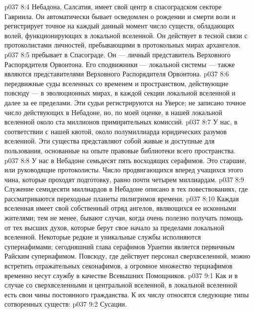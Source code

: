 \vs p037 8:4  Небадона, Салсатия, имеет свой центр в спасоградском секторе Гавриила. Он автоматически бывает осведомлен о рождении и смерти воли и регистрирует точное на каждый данный момент число существ, обладающих волей, функционирующих в локальной вселенной. Он действует в тесной связи с протоколистами личностей, пребывающими в протокольных мирах архангелов.
\vs p037 8:5  пребывает в Спасограде. Он --- личный представитель Верховного Распорядителя Орвонтона. Его сподвижники ---  локальной системы --- также являются представителями Верховного Распорядителя Орвонтона.
\vs p037 8:6  передвижные суды вселенных со временем и пространством, действующие повсюду --- в эволюционных мирах, в каждой секции локальной вселенной и далее за ее пределами. Эти судьи регистрируются на Уверсе; не записано точное число действующих в Небадоне, но, по моей оценке, в нашей локальной вселенной около ста миллионов примирительных комиссий.
\vs p037 8:7 У нас, в соответствии с нашей квотой, около полумиллиарда  юридических разумов вселенной. Эти существа представляют собой живые и доступные для пользования, основанные на опыте правовые библиотеки всего пространства.
\vs p037 8:8 У нас в Небадоне семьдесят пять  восходящих серафимов. Это старшие, или руководящие протоколисты. Число продвигающихся вперед учащихся этого чина, которые проходят подготовку, равно почти четырем миллиардам.
\vs p037 8:9 Служение семидесяти миллиардов  в Небадоне описано в тех повествованиях, где рассматриваются переходные планеты пилигримов времени.
\vs p037 8:10 \pc Каждая вселенная имеет свой собственный отряд ангелов, являющихся ее исконными жителями; тем не менее, бывают случаи, когда очень полезно получать помощь от тех высших духов, которые берут свое начало за пределами локальной вселенной. Некоторые редкие и уникальные службы исполняются супернафимами; сегодняшний глава серафимов Урантии является первичным Райским супернафимом. Повсюду, где действует персонал сверхвселенной, можно встретить отражательных секонафимов, а огромное множество терциафимов временно несут службу в качестве Всевышних Помощников.
\vs p037 9:1 Как и в случае со сверхвселенными и центральной вселенной, в локальной вселенной есть свои чины постоянного гражданства. К их числу относятся следующие типы сотворенных существ:
\vs p037 9:2 \bibnobreakspace Сусации.
